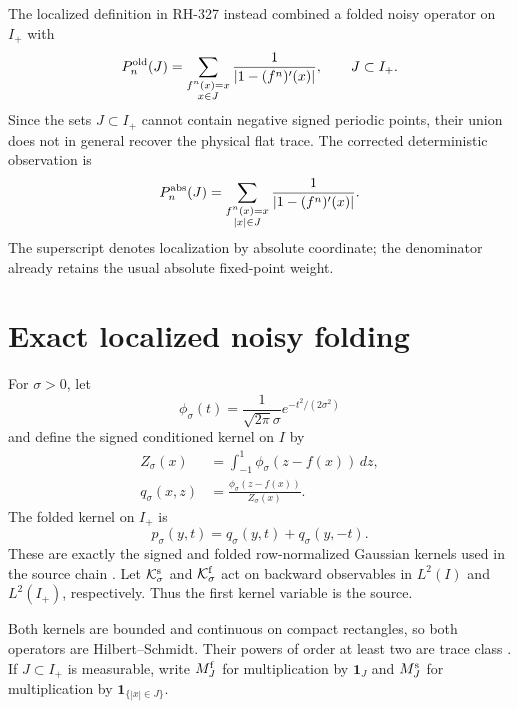 \documentclass[11pt]{article}
\theoremstyle{remark}
\newcommand{\one}{\mathbf 1}
\newcommand{\cK}{\mathcal K}
\begin{document}
The localized definition in RH-327 \citep{WangShell2026} instead combined a
folded noisy operator on $I_+$ with
\begin{equation}\label{eq:old-localization}
 P_n^{\rm old}(J)
 =\sum_{\substack{f^n(x)=x\\x\in J}}
  \frac1{|1-(f^n)'(x)|},\qquad J\subset I_+.
\end{equation}
Since the sets $J\subset I_+$ cannot contain negative signed periodic
points, their union does not in general recover the physical flat trace.
The corrected deterministic observation is
\begin{equation}\label{eq:Pabs}
 P_n^{\rm abs}(J)
 =\sum_{\substack{f^n(x)=x\\|x|\in J}}
  \frac1{|1-(f^n)'(x)|}.
\end{equation}
The superscript denotes localization by absolute coordinate; the denominator
already retains the usual absolute fixed-point weight.

\section{Exact localized noisy folding}

For $\sigma>0$, let
\begin{equation}\label{eq:normal-density}
 \phi_\sigma(t)=\frac1{\sqrt{2\pi}\sigma}
 e^{-t^2/(2\sigma^2)}
\end{equation}
and define the signed conditioned kernel on $I$ by
\begin{align}
 Z_\sigma(x)&=\int_{-1}^1\phi_\sigma(z-f(x))\,dz,\label{eq:signed-normalizer}\\
 q_\sigma(x,z)&=\frac{\phi_\sigma(z-f(x))}{Z_\sigma(x)}.\label{eq:signed-kernel}
\end{align}
The folded kernel on $I_+$ is
\begin{equation}\label{eq:folded-kernel}
 p_\sigma(y,t)=q_\sigma(y,t)+q_\sigma(y,-t).
\end{equation}
These are exactly the signed and folded row-normalized Gaussian kernels used
in the source chain \citep{WangLongCycle2026,WangGaussianReturn2026,
WangComplement2026}.  Let $\cK_\sigma^{\rm s}$ and
$\cK_\sigma^{\rm f}$ act on backward observables in $L^2(I)$ and
$L^2(I_+)$, respectively.  Thus the first kernel variable is the source.

Both kernels are bounded and continuous on compact rectangles, so both
operators are Hilbert--Schmidt.  Their powers of order at least two are trace
class \citep{Simon2005}.  If $J\subset I_+$ is measurable, write
$M_J^{\rm f}$ for multiplication by $\one_J$ and $M_J^{\rm s}$ for
multiplication by $\one_{\{|x|\in J\}}$.
\end{document}
